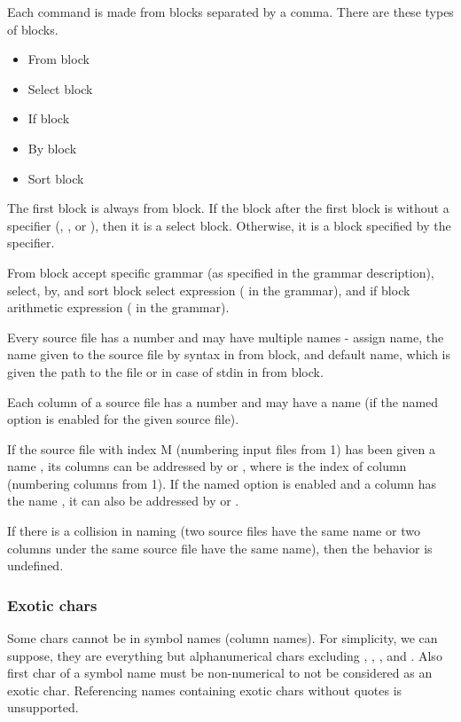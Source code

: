 Each command is made from blocks separated by a comma. There are these types of blocks.
\begin{itemize}
    \item From block
    \item Select block
    \item If block
    \item By block
    \item Sort block
\end{itemize}

The first block is always from block. If the block after the first block is without a specifier (, , or ), then it is a select block. Otherwise, it is a block specified by the specifier.

From block accept specific grammar (as specified in the grammar description), select, by, and sort block select expression ( in the grammar), and if block arithmetic expression ( in the grammar).

Every source file has a number and may have multiple names - assign name, the name given to the source file by  syntax in from block, and  
default name, which is given the path to the file or \icode{-} in case of stdin in from block.

Each column of a source file has a number and may have a name (if the named option is enabled for the given source file).

If the source file with index M (numbering input files from 1) has been given a name , its columns can be addressed by  or , where  is the index of column (numbering columns from 1).  
If the named option is enabled and a column has the name , it can also be addressed by  or .

If there is a collision in naming (two source files have the same name or two columns under the same source file have the same name), then the behavior is undefined.

\subsubsection{Exotic chars}
Some chars cannot be in symbol names (column names). For simplicity, we can suppose, they are everything but alphanumerical chars excluding \icode{-}, , \icode{\&}, and \icode{\_}.  
Also first char of a symbol name must be non-numerical to not be considered as an exotic char.
Referencing names containing exotic chars without quotes is unsupported.

